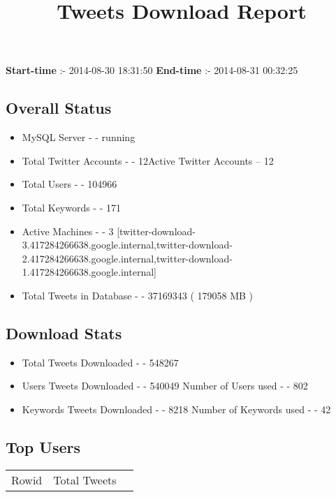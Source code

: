 \documentclass{article}\usepackage[T1]{fontenc}
\begin{document}
\title{\textbf{Tweets Download Report}}
               \date{}
                \maketitle
               \centerline{\textbf{Start-time} :- 2014-08-30 18:31:50 \hspace{40pt} \textbf{End-time} :- 2014-08-31 00:32:25}               \subsection*{Overall Status}                \begin{itemize}                \item MySQL Server - - running               \item Total Twitter Accounts - - 12\newline Active Twitter Accounts -- 12               \item Total Users - - 104966               \item Total Keywords - - 171               \item Active Machines - - 3 [twitter-download-3.417284266638.google.internal,twitter-download-2.417284266638.google.internal,twitter-download-1.417284266638.google.internal]               \item Total Tweets in Database - - 37169343 ( 179058 MB )               \end{itemize}               \subsection*{Download Stats}                \begin{itemize}                \item Total Tweets Downloaded - - 548267               \item Users Tweets Downloaded - - 540049 \newline Number of Users used - - 802               \item Keywords Tweets Downloaded - - 8218 \newline Number of Keywords used - - 42              \end{itemize}              \subsection*{Top Users}\begin{tabular}{|c|c|c|}         \hline         Rowid & Total Tweets \\ 

\end{tabular}
\end{document}
